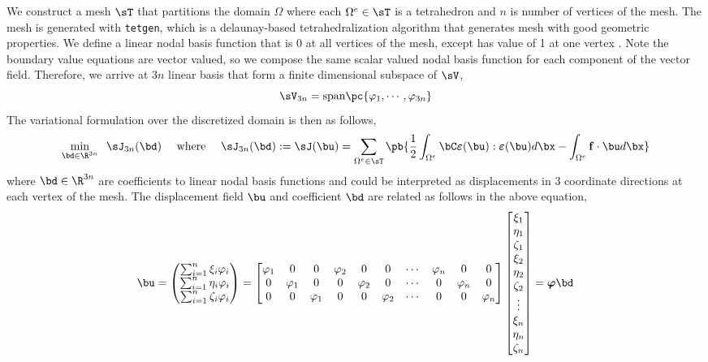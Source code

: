 \documentclass[11pt,titlepage]{article}
\newcommand{\bepsilon}{\boldsymbol{\varepsilon}}
\renewcommand{\bf}{\mathbf{f}}
\renewcommand{\bphi}{\boldsymbol{\varphi}}
\begin{document}
We construct a mesh $\sT$ that partitions the domain $\Omega$ where each $\Omega^e \in\sT$ is a tetrahedron and $n$ is number of vertices of the mesh. The mesh is generated with \texttt{tetgen}, which is a delaunay-based tetrahedralization algorithm that generates mesh with good geometric properties. We define a linear nodal basis function that is 0 at all vertices of the mesh, except has value of 1 at one vertex . Note the boundary value equations are vector valued, so we compose the same scalar valued nodal basis function for each component of the vector field. Therefore, we arrive at $3n$ linear basis that form a finite dimensional subspace of $\sV$,
\[
    \sV_{3n} = \text{span} \pc{
        \varphi_1, \cdots, \varphi_{3n}
    }
\]
The variational formulation over the discretized domain is then as follows,
\[
    \min_{ \bd\in \R^{3n}} \;\; \sJ_{3n}(\bd)
        \quad\text{ where }\quad
        \sJ_{3n}(\bd) := \sJ(\bu) = 
        \sum_{\Omega^e \in \sT} \pb{
            \frac{1}{2}\int_{\Omega^e} \bC \bepsilon(\bu) : \bepsilon(\bu) d\bx 
            - \int_{\Omega^e} \bf \cdot\bu d\bx
        }
\]
where $\bd\in\R^{3n}$ are coefficients to linear nodal basis functions and could be interpreted as displacements in 3 coordinate directions at each vertex of the mesh. The displacement field $\bu$ and coefficient $\bd$ are related as follows in the above equation,
\[
    \bu = 
    \begin{pmatrix}
        \sum_{i=1}^n \xi_i \varphi_i \\
        \sum_{i=1}^n \eta_i \varphi_i \\
        \sum_{i=1}^n \zeta_i \varphi_i \\
    \end{pmatrix}
    =
    \begin{bmatrix}
        \varphi_1 & 0 & 0 & \varphi_2 & 0 & 0 & \cdots & \varphi_{n} & 0 & 0 \\
        0 & \varphi_1 & 0 & 0 & \varphi_2 & 0 & \cdots & 0 & \varphi_{n} & 0 \\
        0 & 0 & \varphi_1 & 0 & 0 & \varphi_2 & \cdots & 0 & 0 & \varphi_{n} \\
    \end{bmatrix}
    \begin{bmatrix}
        \xi_1 \\ \eta_1 \\ \zeta_1 \\
        \xi_2 \\ \eta_2 \\ \zeta_2 \\
        \vdots \\
        \xi_{n} \\ \eta_{n} \\ \zeta_{n} \\
    \end{bmatrix}
    = \bphi \bd
\]
\end{document}
